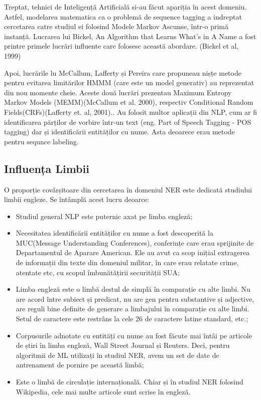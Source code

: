 
Treptat, tehnici de Inteligență Artificială si-au făcut apariția în acest domeniu. Astfel, modelarea matematica ca o problemă de sequence tagging a indreptat cercetarea catre studiul ei folosind Modele Markov Ascunse, într-o primă instanță. Lucrarea lui Bickel, An Algorithm that Learns What's in A Name a fost printre primele lucrări influente care folosesc această abordare. (Bickel et al, 1999)\cite{Bikel99analgorithm}

Apoi, lucrările lu McCallum, Lafferty și Pereira care propuneau nișțe metode pentru evitarea limitărilor HMMM (care este un model generativ) au reprezentat din nou momente cheie. Aceste două lucrări prezentau Maximum Entropy Markov Models (MEMM)(McCallum et al. 2000)\cite{Mccallum00maximumentropy}, respectiv Conditional Random Fields(CRFs)(Lafferty et. al, 2001).\cite{Lafferty01conditionalrandom}. Au folosit multor aplicații din NLP, cum ar fi identificarea părților de vorbire într-un text (eng. Part of Speech Tagging - POS tagging) dar și identificării entităților cu nume. Asta deoarece erau metode pentru sequnce labeling.


\subsection{Influența Limbii}

O proporție covârșitoare din cercetarea în domeniul NER este dedicată studiului limbii engleze. Se întâmplă acest lucru deoarce:

\begin{itemize}
	\item Studiul general NLP este puternic axat pe limba engleză;
	\item Necesitatea identificării entităților cu nume a fost descoperită la MUC(Message Understanding Conferences), conferințe care erau sprijinite de Departamentul de Aparare American. Ele au avut ca scop inițial extragerea de informații din texte din domeniul militar, în care erau relatate crime, atentate etc, cu scopul îmbunătățirii securității SUA;
	\item Limba engleză este o limbă destul de simplă în comparație cu alte limbi. Nu are acord între subiect și predicat, nu are gen pentru substantive și adjective, are reguli bine definite de generare a limbajului în comparație cu alte limbi. Setul de caractere este restrâns la cele 26 de caractere latine standard, etc.;
	\item Corpusurile adnotate cu entități cu nume au fost făcute mai întâi pe articole de știri în limba engleză, Wall Street Journal și Reuters. Deci, pentru algoritmii de ML utilizați în studiul NER, avem un set de date de antrenament de pornire pe această limbă;
	\item Este o limbă de circulație internațională. Chiar și în studiul NER folosind Wikipedia, cele mai multe articole sunt scrise în engleză.
\end{itemize}



